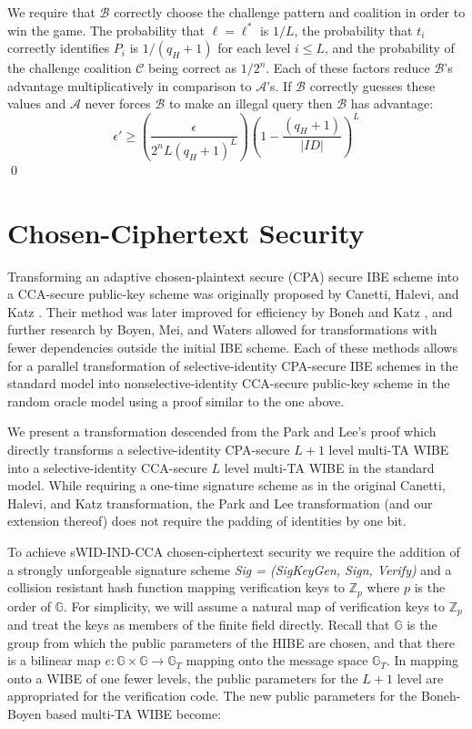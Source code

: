 \documentclass[10pt]{llncs}
\newcommand{\A}{\mathcal{A}}
\newcommand{\B}{\mathcal{B}}
\newcommand{\C}{\mathcal{C}}
\newcommand{\Zbb}{\mathbb{Z}}
\newcommand{\Gbb}{\mathbb{G}}
\newcommand{\ID}{\mathit{ID}}
\begin{document}
We require that $\B$ correctly choose the challenge pattern and coalition in order to win the game. The probability that $\ell = \ell^*$ is $1/L$, the probability that $t_i$ correctly identifies $P_i$ is $1/(q_H + 1)$ for each level $i \le L$, and the probability of the challenge coalition $\C$ being correct as $1/2^n$. Each of these factors reduce $\B$'s advantage multiplicatively in comparison to $\A$'s. If $\B$ correctly guesses these values and $\A$ never forces $\B$ to make an illegal query then $\B$ has advantage:
$$\epsilon' \ge \left(\frac{\epsilon}{2^n L (q_H + 1)^L}\right)\left(1 - \frac{(q_H + 1)}{|\mathcal{\ID}|}\right)^L$$
\qed

\section{Chosen-Ciphertext Security}
Transforming an adaptive chosen-plaintext secure (CPA) secure IBE scheme into a CCA-secure public-key scheme was originally proposed by Canetti, Halevi, and Katz \cite{CHK}. Their method was later improved for efficiency by Boneh and Katz \cite{BK}, and further research by Boyen, Mei, and Waters \cite{BMW} allowed for transformations with fewer dependencies outside the initial IBE scheme. Each of these methods allows for a parallel transformation of selective-identity CPA-secure IBE schemes in the standard model into nonselective-identity CCA-secure public-key scheme in the random oracle model using a proof similar to the one above.

We present a transformation descended from the Park and Lee's proof \cite{Park07} which directly transforms a selective-identity CPA-secure $L+1$ level multi-TA WIBE into a selective-identity CCA-secure $L$ level multi-TA WIBE in the standard model. While requiring a one-time signature scheme as in the original Canetti, Halevi, and Katz transformation, the Park and Lee transformation (and our extension thereof) does not require the padding of identities by one bit.

To achieve sWID-IND-CCA chosen-ciphertext security we require the addition of a strongly unforgeable signature scheme \emph{Sig = (SigKeyGen, Sign, Verify)} and a collision resistant hash function mapping verification keys to $\Zbb_p$ where $p$ is the order of $\Gbb$. For simplicity, we will assume a natural map of verification keys to $\Zbb_p$ and treat the keys as members of the finite field directly. Recall that $\Gbb$ is the group from which the public parameters of the HIBE are chosen, and that there is a bilinear map $e: \Gbb \times \Gbb \rightarrow \Gbb_T$ mapping onto the message space $\Gbb_T$. In mapping onto a WIBE of one fewer levels, the public parameters for the $L+1$ level are appropriated for the verification code. The new public parameters for the Boneh-Boyen based multi-TA WIBE become:
\end{document}
